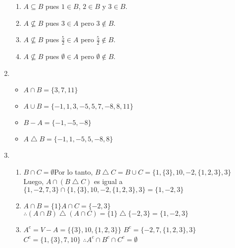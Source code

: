 \begin{enumerate}
\begin{multicols}{2}
\begin{enumerate}
  \item $A \subseteq B$ pues $1 \in B$, $2 \in B$ y $3 \in B$.
  \item $A \not\subseteq B$ pues $3 \in A$ pero $3 \notin B$.
  \item $A \not\subseteq B$ pues $\frac{5}{2} \in A$ pero $\frac{5}{2} \notin B$.
  \item $A \not\subseteq B$ pues $\emptyset \in A$ pero $\emptyset \notin B$.
  \end{enumerate}
  \end{multicols}
\item %
  \begin{itemize}
  \item $A \cap B = \{3, 7, 11\}$
  \item $A \cup B = \{-1,1,3,-5,5,7,-8,8,11\}$
  \item $B - A = \{-1,-5,-8\}$
  \item $A \bigtriangleup B = \{-1,1,-5,5,-8,8\}$
  \end{itemize}
\item %
  \begin{enumerate}
  \item $B \cap C = \emptyset$\newline Por lo tanto, $B \bigtriangleup C = B \cup C = \{1,\{3\},10,-2,\{1,2,3\},3\}$\newline Luego, $A \cap (B \bigtriangleup C)$ es igual a\newline \indent$\{1,-2,7,3\} \cap \{1,\{3\},10,-2,\{1,2,3\},3\} = \{1,-2,3\}$

  \item $A \cap B = \{1\}$\newline $A \cap C = \{-2,3\}$\newline $\therefore (A \cap B) \bigtriangleup (A \cap C) = \{1\} \bigtriangleup \{-2,3\} = \{1,-2,3\}$

  \item $A^c = V - A = \{\{3\},10,\{1,2,3\}\}$\newline
  $B^c = \{-2,7,\{1,2,3\},3\}$\newline
  $C^c = \{1,\{3\},7,10\}$\newline
  $\therefore A^c \cap B^c \cap C^c = \emptyset$

  \end{enumerate}
\end{enumerate}